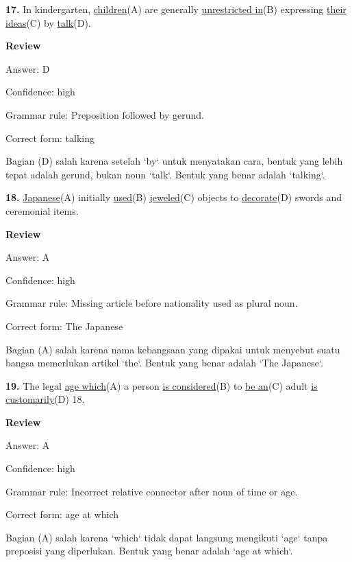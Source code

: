 \documentclass[12pt]{article}
\begin{document}
\endgroup
\par
\vspace{\questionblockgap}
\noindent\textbf{17.} In kindergarten, \uline{children}(A) are generally \uline{unrestricted in}(B) expressing \uline{their ideas}(C) by \uline{talk}(D).
\par
\begingroup
\setlength{\parskip}{0pt}
\setlength{\parindent}{0pt}
\textbf{Review}\par
Answer: D\par
Confidence: high\par
Grammar rule: Preposition followed by gerund.\par
Correct form: talking\par
Bagian (D) salah karena setelah `by` untuk menyatakan cara, bentuk yang lebih tepat adalah gerund, bukan noun `talk`. Bentuk yang benar adalah `talking`.\par
\endgroup
\par
\vspace{\questionblockgap}
\noindent\textbf{18.} \uline{Japanese}(A) initially \uline{used}(B) \uline{jeweled}(C) objects to \uline{decorate}(D) swords and ceremonial items.
\par
\begingroup
\setlength{\parskip}{0pt}
\setlength{\parindent}{0pt}
\textbf{Review}\par
Answer: A\par
Confidence: high\par
Grammar rule: Missing article before nationality used as plural noun.\par
Correct form: The Japanese\par
Bagian (A) salah karena nama kebangsaan yang dipakai untuk menyebut suatu bangsa memerlukan artikel `the`. Bentuk yang benar adalah `The Japanese`.\par
\endgroup
\par
\vspace{\questionblockgap}
\noindent\textbf{19.} The legal \uline{age which}(A) a person \uline{is considered}(B) to \uline{be an}(C) adult \uline{is customarily}(D) 18.
\par
\begingroup
\setlength{\parskip}{0pt}
\setlength{\parindent}{0pt}
\textbf{Review}\par
Answer: A\par
Confidence: high\par
Grammar rule: Incorrect relative connector after noun of time or age.\par
Correct form: age at which\par
Bagian (A) salah karena `which` tidak dapat langsung mengikuti `age` tanpa preposisi yang diperlukan. Bentuk yang benar adalah `age at which`.\par
\end{document}
